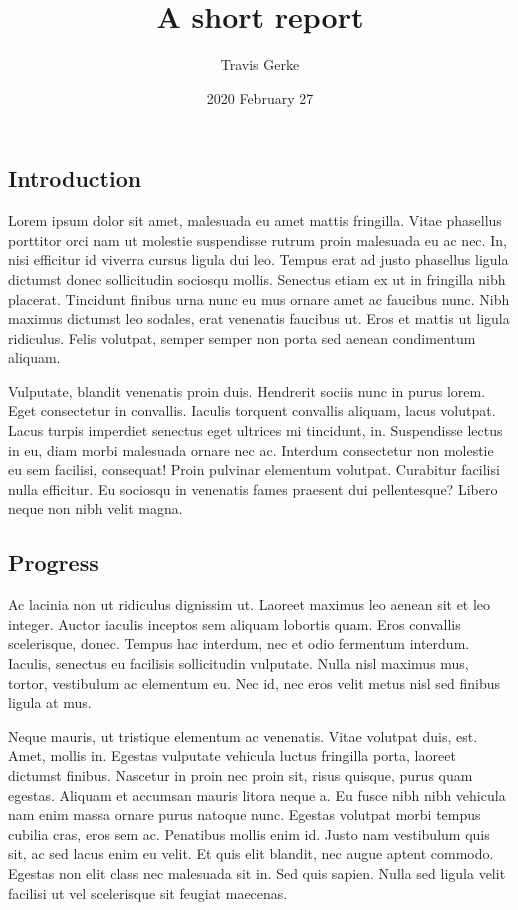 \documentclass[]{article}
\title{A short report}
\author{Travis Gerke}
\date{2020 February 27}
\makeatletter
\renewcommand{\maketitle}{\bgroup\vspace*{-1cm}\setlength{\parindent}{0pt}
\begin{flushleft}
  \@author

  \@date

\end{flushleft}\egroup
}
\makeatother
\begin{document}
\maketitle

\hypertarget{introduction}{%
\subsection{Introduction}\label{introduction}}

Lorem ipsum dolor sit amet, malesuada eu amet mattis fringilla. Vitae
phasellus porttitor orci nam ut molestie suspendisse rutrum proin
malesuada eu ac nec. In, nisi efficitur id viverra cursus ligula dui
leo. Tempus erat ad justo phasellus ligula dictumst donec sollicitudin
sociosqu mollis. Senectus etiam ex ut in fringilla nibh placerat.
Tincidunt finibus urna nunc eu mus ornare amet ac faucibus nunc. Nibh
maximus dictumst leo sodales, erat venenatis faucibus ut. Eros et mattis
ut ligula ridiculus. Felis volutpat, semper semper non porta sed aenean
condimentum aliquam.

Vulputate, blandit venenatis proin duis. Hendrerit sociis nunc in purus
lorem. Eget consectetur in convallis. Iaculis torquent convallis
aliquam, lacus volutpat. Lacus turpis imperdiet senectus eget ultrices
mi tincidunt, in. Suspendisse lectus in eu, diam morbi malesuada ornare
nec ac. Interdum consectetur non molestie eu sem facilisi, consequat!
Proin pulvinar elementum volutpat. Curabitur facilisi nulla efficitur.
Eu sociosqu in venenatis fames praesent dui pellentesque? Libero neque
non nibh velit magna.

\hypertarget{progress}{%
\subsection{Progress}\label{progress}}

Ac lacinia non ut ridiculus dignissim ut. Laoreet maximus leo aenean sit
et leo integer. Auctor iaculis inceptos sem aliquam lobortis quam. Eros
convallis scelerisque, donec. Tempus hac interdum, nec et odio fermentum
interdum. Iaculis, senectus eu facilisis sollicitudin vulputate. Nulla
nisl maximus mus, tortor, vestibulum ac elementum eu. Nec id, nec eros
velit metus nisl sed finibus ligula at mus.

Neque mauris, ut tristique elementum ac venenatis. Vitae volutpat duis,
est. Amet, mollis in. Egestas vulputate vehicula luctus fringilla porta,
laoreet dictumst finibus. Nascetur in proin nec proin sit, risus
quisque, purus quam egestas. Aliquam et accumsan mauris litora neque a.
Eu fusce nibh nibh vehicula nam enim massa ornare purus natoque nunc.
Egestas volutpat morbi tempus cubilia cras, eros sem ac. Penatibus
mollis enim id. Justo nam vestibulum quis sit, ac sed lacus enim eu
velit. Et quis elit blandit, nec augue aptent commodo. Egestas non elit
class nec malesuada sit in. Sed quis sapien. Nulla sed ligula velit
facilisi ut vel scelerisque sit feugiat maecenas.
\end{document}
